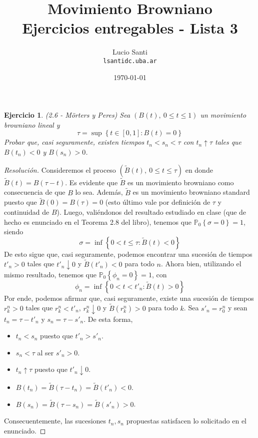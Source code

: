 \documentclass[a4paper,11pt]{article}
\title{Movimiento Browniano\\
      \small{Ejercicios entregables - Lista 3}}
\author{Lucio Santi\\
        \texttt{lsanti\at dc.uba.ar}}
\date{\today}
\newcommand{\Probx}[2]{\ensuremath{\mathbb{P}_{#1} \left\{ #2 \right\}}}
\newtheorem*{ej}{Ejercicio}
\begin{document}
\maketitle

\begin{ej} 
(2.6 - Mörters y Peres) Sea $(B(t),~ 0 \leq t \leq 1)$ un movimiento browniano lineal y
$$\tau = \sup \left\{ t \in [0,1] : B(t) = 0 \right\}$$
Probar que, casi seguramente, existen tiempos $t_n < s_n < \tau$
con $t_n \uparrow \tau$ tales que $B(t_n) < 0$ y $B(s_n) > 0$.
\end{ej}

\begin{proof}[Resoluci\'on]
Consideremos el proceso $(\tilde{B}(t),~ 0 \leq t \leq \tau)$ en donde
$\tilde{B}(t) = B(\tau - t)$. Es evidente que $\tilde{B}$ es un movimiento browniano
como consecuencia de que $B$ lo sea. Además, $\tilde{B}$ es un movimiento browniano
standard puesto que $\tilde{B}(0) = B(\tau) = 0$ (esto último vale por definición
de $\tau$ y continuidad de $B$). Luego, valiéndonos del resultado estudiado en clase
(que de hecho es enunciado en el Teorema 2.8 del libro), tenemos que
$\Probx{0}{\sigma = 0} = 1$, siendo
$$\sigma = \inf \left\{ 0 < t \leq \tau : \tilde{B}(t) < 0 \right\}$$
De esto sigue que, casi seguramente, podemos encontrar una sucesión
de tiempos $t'_n > 0$ tales que $t'_n \downarrow 0$ y $\tilde{B}(t'_n) < 0$ para todo
$n$. Ahora bien, utilizando el mismo resultado, tenemos que $\Probx{0}{\phi_n = 0} = 1$, 
con
$$\phi_n = \inf \left\{ 0 < t < t'_n : \tilde{B}(t) > 0 \right\}$$
Por ende, podemos afirmar que, casi seguramente, existe una sucesión de tiempos
$r^n_k > 0$ tales que $r^n_k < t'_n$, $r^n_k \downarrow 0$ y $\tilde{B}(r^n_k) > 0$ para todo
$k$. Sea $s'_n = r^n_0$ y sean $t_n = \tau - t'_n$ y $s_n = \tau - s'_n$. De esta forma,
\begin{itemize}
    \item $t_n < s_n$ puesto que $t'_n > s'_n$.
    \item $s_n < \tau$ al ser $s'_n > 0$.
    \item $t_n \uparrow \tau$ puesto que $t'_n \downarrow 0$.
    \item $B(t_n) = \tilde{B}(\tau - t_n) = \tilde{B}(t'_n) < 0$.
    \item $B(s_n) = \tilde{B}(\tau - s_n) = \tilde{B}(s'_n) > 0$.
\end{itemize}
Consecuentemente, las sucesiones $t_n, s_n$ propuestas satisfacen lo solicitado en el enunciado.

\end{proof}
\end{document}
